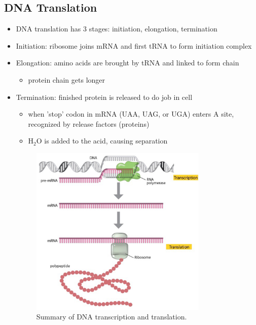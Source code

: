 \documentclass[10pt]{article}
\begin{document}
\subsection{DNA Translation}
\begin{itemize}
    \item DNA translation has 3 stages: initiation, elongation, termination
    \item Initiation: ribosome joins mRNA and first tRNA to form initiation complex
    \item Elongation: amino acids are brought by tRNA and linked to form chain 
        \begin{itemize}
            \item protein chain gets longer 
        \end{itemize}
    \item Termination: finished protein is released to do job in cell 
        \begin{itemize}
            \item when 'stop' codon in mRNA (UAA, UAG, or UGA) enters A site, recognized by release factors (proteins)
            \item H$_2$O is added to the acid, causing separation
        \end{itemize}
        \begin{figure}[h]
            \centering
            \includegraphics[width=0.8\textwidth]{DNATranscriptionTranslation}
            \caption{Summary of DNA transcription and translation.}
            \label{fig:DNATranscriptionTranslation}
        \end{figure}
\end{itemize}
\end{document}
